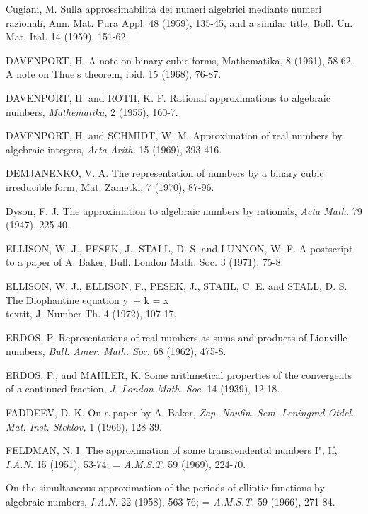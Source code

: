 \begin{hanglist}
    \item Cugiani, M. Sulla approssimabilità dei numeri algebrici mediante numeri razionali, Ann. Mat. Pura Appl. 48 (1959), 135-45, and a similar title, Boll. Un. Mat. Ital. 14 (1959), 151-62.
    \item DAVENPORT, H. A note on binary cubic forms, Mathematika, 8 (1961), 58-62. A note on Thue's theorem, ibid. 15 (1968), 76-87.
    \item DAVENPORT, H. and ROTH, K. F. Rational approximations to algebraic numbers, \textit{Mathematika}, 2 (1955), 160-7.
    \item DAVENPORT, H. and SCHMIDT, W. M. Approximation of real numbers by algebraic integers, \textit{Acta Arith.} 15 (1969), 393-416.
    \item DEMJANENKO, V. A. The representation of numbers by a binary cubic irreducible form, Mat. Zametki, 7 (1970), 87-96.
    \item Dyson, F. J. The approximation to algebraic numbers by rationals, \textit{Acta Math.} 79 (1947), 225-40.
    \item ELLISON, W. J., PESEK, J., STALL, D. S. and LUNNON, W. F. A postscript to a paper of A. Baker, Bull. London Math. Soc. 3 (1971), 75-8.
    \item ELLISON, W. J., ELLISON, F., PESEK, J., STAHL, C. E. and STALL, D. S. The Diophantine equation y\ + k = x\\textit{, J. Number Th.} 4 (1972), 107-17.
    \item ERDOS, P. Representations of real numbers as sums and products of Liouville numbers, \textit{Bull. Amer. Math. Soc.} 68 (1962), 475-8.
    \item ERDOS, P., and MAHLER, K. Some arithmetical properties of the convergents of a continued fraction, \textit{J. London Math. Soc.} 14 (1939), 12-18.
    \item FADDEEV, D. K. On a paper by A. Baker, \textit{Zap. Nau6n. Sem. Leningrad Otdel. Mat. Inst. Steklov,} 1 (1966), 128-39.
    \item FELDMAN, N. I. The approximation of some transcendental numbers I", If, \textit{I.A.N.} 15 (1951), 53-74; = \textit{A.M.S.T.} 59 (1969), 224-70.
    \item \hspace{1.5em} On the simultaneous approximation of the periods of elliptic functions by algebraic numbers, \textit{I.A.N.} 22 (1958), 563-76; = \textit{A.M.S.T.} 59 (1966), 271-84.

\end{hanglist}
